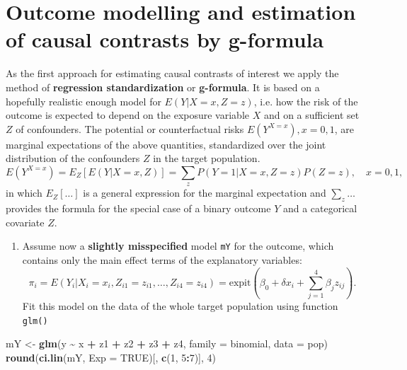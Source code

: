 \documentclass[
]{book}
\newenvironment{Shaded}{\begin{snugshade}}{\end{snugshade}}
\newcommand{\AttributeTok}[1]{\textcolor[rgb]{0.13,0.29,0.53}{#1}}
\newcommand{\ConstantTok}[1]{\textcolor[rgb]{0.56,0.35,0.01}{#1}}
\newcommand{\DecValTok}[1]{\textcolor[rgb]{0.00,0.00,0.81}{#1}}
\newcommand{\FunctionTok}[1]{\textcolor[rgb]{0.13,0.29,0.53}{\textbf{#1}}}
\newcommand{\NormalTok}[1]{#1}
\newcommand{\OtherTok}[1]{\textcolor[rgb]{0.56,0.35,0.01}{#1}}
\newcommand{\SpecialCharTok}[1]{\textcolor[rgb]{0.81,0.36,0.00}{\textbf{#1}}}
\providecommand{\tightlist}{%
  \setlength{\itemsep}{0pt}\setlength{\parskip}{0pt}}
\theoremstyle{definition}
\theoremstyle{definition}
\theoremstyle{definition}
\theoremstyle{definition}
\theoremstyle{remark}
\begin{document}
\section{Outcome modelling and estimation of causal contrasts by g-formula}\label{outcome-modelling-and-estimation-of-causal-contrasts-by-g-formula}

As the first approach for estimating causal contrasts of interest we
apply the method of \textbf{regression standardization} or \textbf{g-formula}. It
is based on a hopefully realistic enough model for \(E(Y|X=x, Z=z)\), i.e.
how the risk of the outcome is expected to depend on the exposure
variable \(X\) and on a sufficient set \(Z\) of confounders. The potential
or counterfactual risks \(E(Y^{X=x}), x=0,1\), are marginal expectations
of the above quantities, standardized over the joint distribution of the
confounders \(Z\) in the target population.
\[ E(Y^{X=x}) = E_Z[E(Y|X=x,Z)]
       = \sum_z P(Y=1|X=x, Z=z)P(Z=z), \quad x=0,1, \]
in which \(E_Z[\dots]\) is a general expression for the marginal
expectation and \(\sum_z \dots\) provides the formula for the special
case of a binary outcome \(Y\) and a categorical covariate \(Z\).

\begin{enumerate}
\def\labelenumi{\arabic{enumi}.}
\tightlist
\item
  Assume now a \textbf{slightly misspecified} model \texttt{mY} for the outcome,
  which contains only the main effect terms of the explanatory
  variables:
  \[ \pi_i = E(Y_i|X_i=x_i, Z_{i1}=z_{i1}, \dots, Z_{i4}=z_{i4}) =
    \text{expit}\left(\beta_0 + \delta x_i +
    \sum_{j=1}^4 \beta_j z_{ij} \right) . \] Fit this model on the
  data of the whole target population using function \texttt{glm()}
\end{enumerate}

\begin{Shaded}
\begin{Highlighting}[]
\NormalTok{mY }\OtherTok{\textless{}{-}} \FunctionTok{glm}\NormalTok{(y }\SpecialCharTok{\textasciitilde{}}\NormalTok{ x }\SpecialCharTok{+}\NormalTok{ z1 }\SpecialCharTok{+}\NormalTok{ z2 }\SpecialCharTok{+}\NormalTok{ z3 }\SpecialCharTok{+}\NormalTok{ z4, }\AttributeTok{family =}\NormalTok{ binomial, }\AttributeTok{data =}\NormalTok{ pop)}
\FunctionTok{round}\NormalTok{(}\FunctionTok{ci.lin}\NormalTok{(mY, }\AttributeTok{Exp =} \ConstantTok{TRUE}\NormalTok{)[, }\FunctionTok{c}\NormalTok{(}\DecValTok{1}\NormalTok{, }\DecValTok{5}\SpecialCharTok{:}\DecValTok{7}\NormalTok{)], }\DecValTok{4}\NormalTok{)}
\end{Highlighting}
\end{Shaded}
\end{document}
